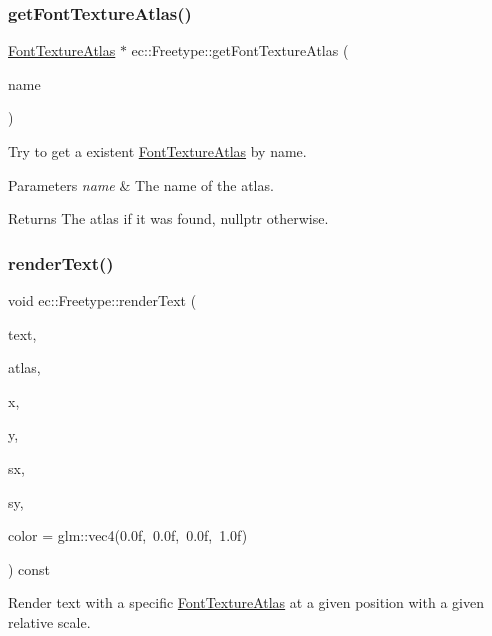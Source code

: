 \subsubsection{\texorpdfstring{get\+Font\+Texture\+Atlas()}{getFontTextureAtlas()}}
{\footnotesize\ttfamily \mbox{\hyperlink{classec_1_1_font_texture_atlas}{Font\+Texture\+Atlas}} $\ast$ ec\+::\+Freetype\+::get\+Font\+Texture\+Atlas (\begin{DoxyParamCaption}\item[{const std\+::string \&}]{name }\end{DoxyParamCaption})}



Try to get a existent \mbox{\hyperlink{classec_1_1_font_texture_atlas}{Font\+Texture\+Atlas}} by name. 


\begin{DoxyParams}{Parameters}
{\em name} & The name of the atlas. \\
\hline
\end{DoxyParams}
\begin{DoxyReturn}{Returns}
The atlas if it was found, nullptr otherwise. 
\end{DoxyReturn}
\mbox{\label{classec_1_1_freetype_afef1f61fa4bd8114825c66ac93d3e6bf}} 
\subsubsection{\texorpdfstring{render\+Text()}{renderText()}}
{\footnotesize\ttfamily void ec\+::\+Freetype\+::render\+Text (\begin{DoxyParamCaption}\item[{const char $\ast$}]{text,  }\item[{\mbox{\hyperlink{classec_1_1_font_texture_atlas}{Font\+Texture\+Atlas}} $\ast$}]{atlas,  }\item[{float}]{x,  }\item[{float}]{y,  }\item[{float}]{sx,  }\item[{float}]{sy,  }\item[{const glm\+::vec4 \&}]{color = {\ttfamily glm\+:\+:vec4(0.0f,~0.0f,~0.0f,~1.0f)} }\end{DoxyParamCaption}) const}



Render text with a specific \mbox{\hyperlink{classec_1_1_font_texture_atlas}{Font\+Texture\+Atlas}} at a given position with a given relative scale. 



